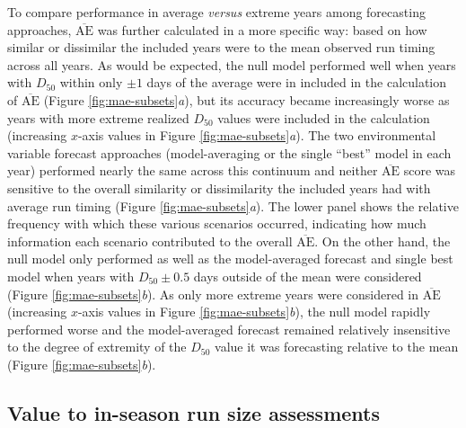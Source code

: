 \documentclass[12pt,]{book}
\theoremstyle{definition}
\theoremstyle{definition}
\theoremstyle{definition}
\theoremstyle{remark}
\begin{document}
To compare performance in average \emph{versus} extreme years among
forecasting approaches, \(\overline{\text{AE}}\) was further calculated
in a more specific way: based on how similar or dissimilar the included
years were to the mean observed run timing across all years. As would be
expected, the null model performed well when years with \(D_{50}\)
within only \(\pm 1\) days of the average were in included in the
calculation of \(\overline{\text{AE}}\) (Figure
\ref{fig:mae-subsets}\emph{a}), but its accuracy became increasingly
worse as years with more extreme realized \(D_{50}\) values were
included in the calculation (increasing \(x\)-axis values in Figure
\ref{fig:mae-subsets}\emph{a}). The two environmental variable forecast
approaches (model-averaging or the single ``best'' model in each year)
performed nearly the same across this continuum and neither
\(\overline{\text{AE}}\) score was sensitive to the overall similarity
or dissimilarity the included years had with average run timing (Figure
\ref{fig:mae-subsets}\emph{a}). The lower panel shows the relative
frequency with which these various scenarios occurred, indicating how
much information each scenario contributed to the overall
\(\overline{\text{AE}}\). On the other hand, the null model only
performed as well as the model-averaged forecast and single best model
when years with \(D_{50} \pm 0.5\) days outside of the mean were
considered (Figure \ref{fig:mae-subsets}\emph{b}). As only more extreme
years were considered in \(\overline{\text{AE}}\) (increasing \(x\)-axis
values in Figure \ref{fig:mae-subsets}\emph{b}), the null model rapidly
performed worse and the model-averaged forecast remained relatively
insensitive to the degree of extremity of the \(D_{50}\) value it was
forecasting relative to the mean (Figure \ref{fig:mae-subsets}\emph{b}).

\subsection{Value to in-season run size
assessments}\label{value-to-in-season-run-size-assessments}
\end{document}
